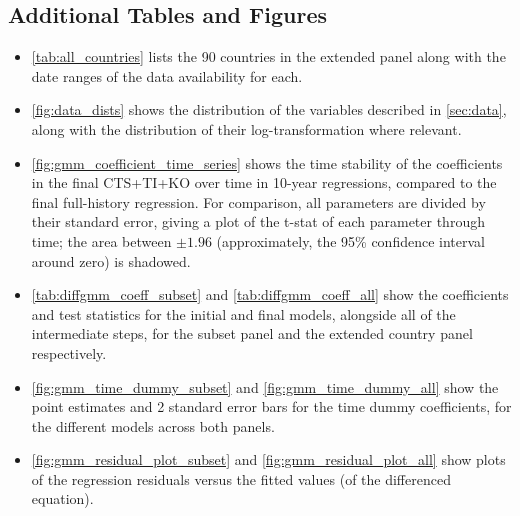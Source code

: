 \documentclass[12pt,a4paper]{article}
\begin{document}
\subsection{Additional Tables and Figures}\label{sec:graph_appendix}

\begin{itemize}
\item \cref{tab:all_countries} lists the 90 countries in the extended panel along with the date ranges of the data availability for each.
\item \cref{fig:data_dists} shows the distribution of the variables described in \cref{sec:data}, along with the distribution of their log-transformation where relevant.
\item \cref{fig:gmm_coefficient_time_series} shows the time stability of the coefficients in the final CTS+TI+KO over time in 10-year regressions, compared to the final full-history regression.
For comparison, all parameters are divided by their standard error, giving a plot of the t-stat of each parameter through time; the area between $\pm 1.96$ (approximately, the 95\% confidence interval around zero) is shadowed.
\item \cref{tab:diffgmm_coeff_subset} and \cref{tab:diffgmm_coeff_all} show the coefficients and test statistics for the initial and final models, alongside all of the intermediate steps, for the subset panel and the extended country panel respectively.
\item \cref{fig:gmm_time_dummy_subset} and \cref{fig:gmm_time_dummy_all} show the point estimates and 2 standard error bars for the time dummy coefficients, for the different models across both panels.
\item \cref{fig:gmm_residual_plot_subset} and \cref{fig:gmm_residual_plot_all} show plots of the regression residuals versus the fitted values (of the differenced equation).
\end{itemize}
\end{document}
